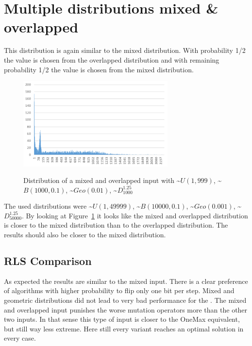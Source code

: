 \section{Multiple distributions mixed \& overlapped}
This distribution is again similar to the mixed distribution.
With probability 1/2 the value is chosen from the overlapped distribution and with remaining probability 1/2 the value is chosen from the mixed distribution.

\begin{figure}[h]
      \caption{Distribution of a mixed and overlapped input with \textasciitilde$U(1,999)$, \textasciitilde$B(1000,0.1)$, \textasciitilde$Geo(0.01)$, \textasciitilde$D^{1.25}_{1000}$}
      \centering
      \includegraphics[width=0.7\textwidth]{figures/images/numberGenerator/mixedAndOverlapped.png}\label{fig:mixAndOverlDistExample}
\end{figure}

The used distributions were \textasciitilde$U(1,49999)$, \textasciitilde$B(10000,0.1)$, \textasciitilde$Geo(0.001)$, \textasciitilde$D^{1.25}_{50000}$.
By looking at Figure~\ref{fig:mixAndOverlDistExample} it looks like the mixed and overlapped distribution is closer to the mixed distribution than to the overlapped distribution.
The results should also be closer to the mixed distribution.
\subsection{RLS Comparison}




As expected the results are similar to the mixed input.
There is a clear preference of algorithms with higher probability to flip only one bit per step.
Mixed and geometric distributions did not lead to very bad performance for the \RLSN[4].
The mixed and overlapped input punishes the worse mutation operators more than the other two inputs.
In that sense this type of input is closer to the OneMax equivalent, but still way less extreme.
Here still every variant reaches an optimal solution in every case.
